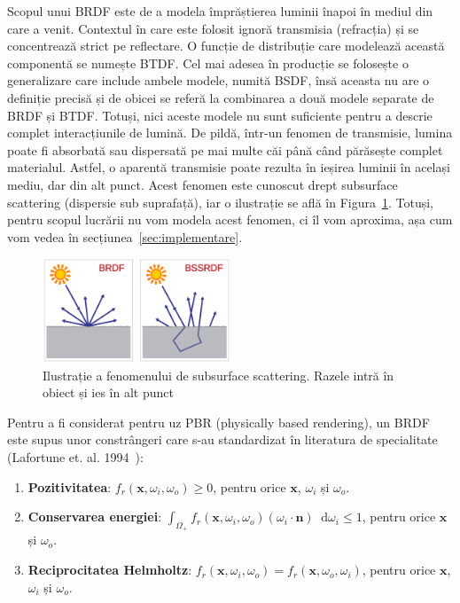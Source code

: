\documentclass[12pt,a4paper]{report}
\newcommand*\diff{\mathop{}\!\mathrm{d}}
\numberwithin{equation}{section} %
\begin{document}
Scopul unui BRDF este de a modela împrăștierea luminii înapoi în mediul din care a venit.
Contextul în care este folosit ignoră transmisia (refracția) și se concentrează strict
pe reflectare. O funcție de distribuție care modelează această componentă se numește
BTDF. Cel mai adesea în producție se folosește o generalizare care include ambele
modele, numită BSDF, însă aceasta nu are o definiție precisă și de obicei se referă
la combinarea a două modele separate de BRDF și BTDF. Totuși, nici aceste modele nu sunt
suficiente pentru a descrie complet interacțiunile de lumină. De pildă, într-un fenomen
de transmisie, lumina poate fi absorbată sau dispersată pe mai multe căi până când
părăsește complet materialul. Astfel, o aparentă transmisie poate rezulta în ieșirea
luminii în același mediu, dar din alt punct. Acest fenomen este cunoscut drept
subsurface scattering (dispersie sub suprafață), iar o ilustrație se află în Figura~\ref{fig:sss}.
Totuși, pentru scopul lucrării nu vom modela acest fenomen, ci îl vom aproxima,
așa cum vom vedea în secțiunea~\ref{sec:implementare}.

\begin{figure}[ht]
	\centering
	\includegraphics[width=0.5\textwidth]{pics/bssrdf.png}
	\caption{Ilustrație a fenomenului de subsurface scattering. Razele intră în obiect și ies în alt punct\protect{}}
	\label{fig:sss}
\end{figure}

Pentru a fi considerat pentru uz PBR (physically based rendering), un BRDF
este supus unor constrângeri care s-au standardizat în literatura de specialitate
(Lafortune et. al. 1994~\cite{Lafortune}):

\begin{enumerate}
	\item \textbf{Pozitivitatea}: $f_r(\mathbf{x}, \omega_i, \omega_o) \geq 0$, pentru orice $\mathbf{x}$, $\omega_i$ și $\omega_o$.
	\item \textbf{Conservarea energiei}: $\int_{\Omega_+} f_r(\mathbf{x}, \omega_i, \omega_o) (\omega_i \cdot \mathbf{n}) \diff \omega_i \leq 1$, pentru orice $\mathbf{x}$ și $\omega_o$.
	\item \textbf{Reciprocitatea Helmholtz}: $f_r(\mathbf{x}, \omega_i, \omega_o) = f_r(\mathbf{x}, \omega_o, \omega_i)$, pentru orice $\mathbf{x}$, $\omega_i$ și $\omega_o$.
\end{enumerate}
\end{document}
